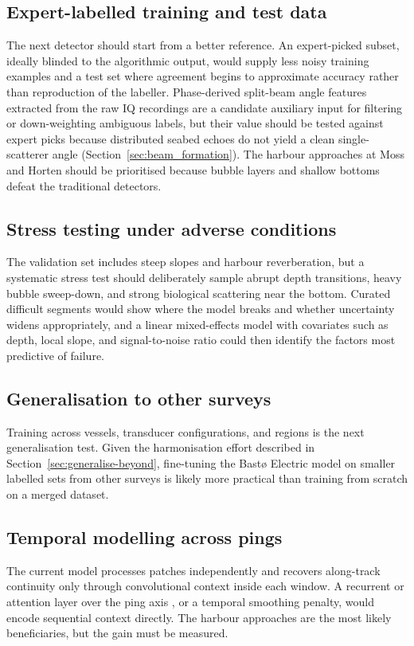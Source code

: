 \subsection{Expert-labelled training and test data}
\label{sec:expert-labelled-reference}
The next detector should start from a better reference. An expert-picked subset, ideally blinded to the algorithmic output, would supply less noisy training examples and a test set where agreement begins to approximate accuracy rather than reproduction of the labeller. Phase-derived split-beam angle features extracted from the raw IQ recordings are a candidate auxiliary input for filtering or down-weighting ambiguous labels, but their value should be tested against expert picks because distributed seabed echoes do not yield a clean single-scatterer angle (Section~\ref{sec:beam_formation}). The harbour approaches at Moss and Horten should be prioritised because bubble layers and shallow bottoms defeat the traditional detectors.

\subsection{Stress testing under adverse conditions}
The validation set includes steep slopes and harbour reverberation, but a systematic stress test should deliberately sample abrupt depth transitions, heavy bubble sweep-down, and strong biological scattering near the bottom. Curated difficult segments would show where the model breaks and whether uncertainty widens appropriately, and a linear mixed-effects model with covariates such as depth, local slope, and signal-to-noise ratio could then identify the factors most predictive of failure.

\subsection{Generalisation to other surveys}
Training across vessels, transducer configurations, and regions is the next generalisation test. Given the harmonisation effort described in Section~\ref{sec:generalise-beyond}, fine-tuning the Bast\o{} Electric model on smaller labelled sets from other surveys is likely more practical than training from scratch on a merged dataset.

\subsection{Temporal modelling across pings}
The current model processes patches independently and recovers along-track continuity only through convolutional context inside each window. A recurrent or attention layer over the ping axis \cite{shi_convolutional_2015,vaswani_attention_2017}, or a temporal smoothing penalty, would encode sequential context directly. The harbour approaches are the most likely beneficiaries, but the gain must be measured.

